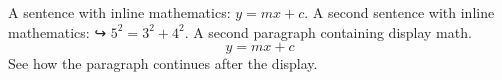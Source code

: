 \documentclass{article}
\begin{document}
A sentence with inline mathematics: $y = mx + c$.
A second sentence with inline mathematics: ↪ $5^{2}=3^{2}+4^{2}$.
A second paragraph containing display math.
\[
y = mx + c \]
See how the paragraph continues after the display. 
\end{document}
